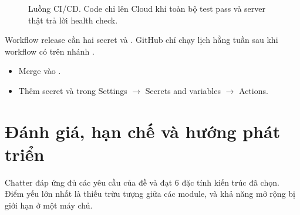 \documentclass[11pt, a4paper]{article}
\begin{document}
\begin{figure}[H]
  \caption{Luồng CI/CD. Code chỉ lên Cloud khi toàn bộ test pass và server thật trả lời health check.}
  \label{fig:cicd}
\end{figure}

Workflow release cần hai secret  và . GitHub chỉ chạy lịch hằng tuần sau khi workflow có trên nhánh .
\begin{itemize}[label=$\square$]
  \item Merge  vào .
  \item Thêm secret  và  trong Settings $\rightarrow$ Secrets and variables $\rightarrow$ Actions.
\end{itemize}

\section{Đánh giá, hạn chế và hướng phát triển}
\label{sec:eval}

Chatter đáp ứng đủ các yêu cầu của đề và đạt 6 đặc tính kiến trúc đã chọn. Điểm yếu lớn nhất là thiếu trừu tượng giữa các module, và khả năng mở rộng bị giới hạn ở một máy chủ.
\end{document}
